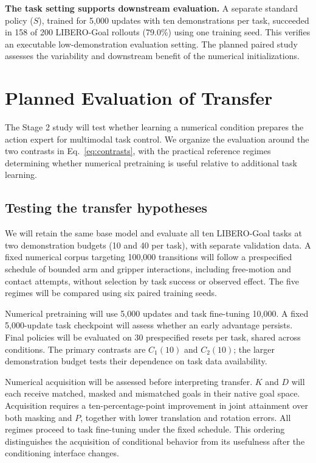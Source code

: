 \documentclass[conference]{IEEEtran}
\begin{document}
\textbf{The task setting supports downstream evaluation.} A separate standard policy ($S$), trained for 5,000 updates with ten demonstrations per task, succeeded in 158 of 200 LIBERO-Goal rollouts (79.0\%) using one training seed. This verifies an executable low-demonstration evaluation setting. The planned paired study assesses the variability and downstream benefit of the numerical initializations.

\section{Planned Evaluation of Transfer}
The Stage 2 study will test whether learning a numerical condition prepares the action expert for multimodal task control. We organize the evaluation around the two contrasts in Eq.~\eqref{eq:contrasts}, with the practical reference regimes determining whether numerical pretraining is useful relative to additional task learning.

\subsection{Testing the transfer hypotheses}
We will retain the same base model and evaluate all ten LIBERO-Goal tasks at two demonstration budgets (10 and 40 per task), with separate validation data. A fixed numerical corpus targeting 100,000 transitions will follow a prespecified schedule of bounded arm and gripper interactions, including free-motion and contact attempts, without selection by task success or observed effect. The five regimes will be compared using six paired training seeds.

Numerical pretraining will use 5,000 updates and task fine-tuning 10,000. A fixed 5,000-update task checkpoint will assess whether an early advantage persists. Final policies will be evaluated on 30 prespecified resets per task, shared across conditions. The primary contrasts are $C_1(10)$ and $C_2(10)$; the larger demonstration budget tests their dependence on task data availability.

Numerical acquisition will be assessed before interpreting transfer. $K$ and $D$ will each receive matched, masked and mismatched goals in their native goal space. Acquisition requires a ten-percentage-point improvement in joint attainment over both masking and $P$, together with lower translation and rotation errors. All regimes proceed to task fine-tuning under the fixed schedule. This ordering distinguishes the acquisition of conditional behavior from its usefulness after the conditioning interface changes.
\end{document}
